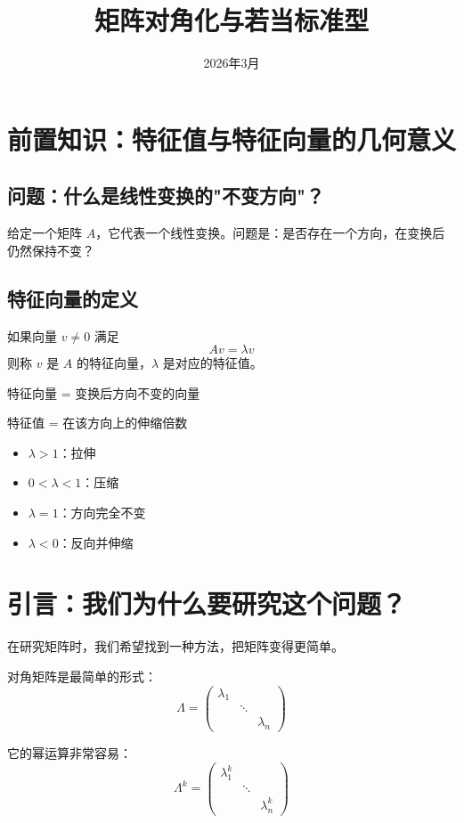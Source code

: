 \documentclass[12pt,a4paper]{article}
\title{矩阵对角化与若当标准型}
\date{2026年3月}
\begin{document}
\maketitle

\tableofcontents

\section{前置知识：特征值与特征向量的几何意义}

\subsection{问题：什么是线性变换的"不变方向"？}

给定一个矩阵 $A$，它代表一个线性变换。问题是：是否存在一个方向，在变换后仍然保持不变？

\subsection{特征向量的定义}

如果向量 $v \neq 0$ 满足
\[
Av = \lambda v
\]
则称 $v$ 是 $A$ 的特征向量，$\lambda$ 是对应的特征值。

特征向量 = 变换后方向不变的向量

特征值 = 在该方向上的伸缩倍数

\begin{itemize}
    \item $\lambda > 1$：拉伸
    \item $0 < \lambda < 1$：压缩
    \item $\lambda = 1$：方向完全不变
    \item $\lambda < 0$：反向并伸缩
\end{itemize}

\section{引言：我们为什么要研究这个问题？}

在研究矩阵时，我们希望找到一种方法，把矩阵变得更简单。

对角矩阵是最简单的形式：
\[
\Lambda = \begin{pmatrix}
\lambda_1 & & \\
& \ddots & \\
& & \lambda_n
\end{pmatrix}
\]

它的幂运算非常容易：
\[
\Lambda^k = \begin{pmatrix}
\lambda_1^k & & \\
& \ddots & \\
& & \lambda_n^k
\end{pmatrix}
\]
\end{document}
